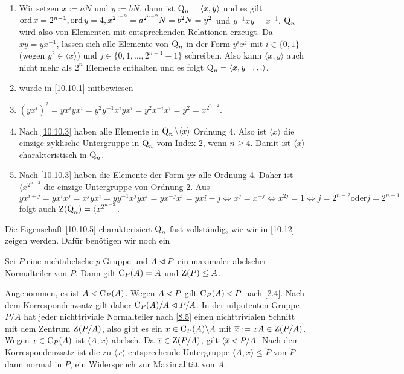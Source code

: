 \begin{beweis}\spspace
 \begin{enumerate}
  \item \label{10.10.1}Wir setzen $x:=aN$ und $y:=bN$, dann ist $\operatorname{Q}_n=\langle x,y\rangle$ und es gilt $\operatorname{ord} x=2^{n-1}, \operatorname{ord} y = 4, x^{2^{n-2}}=a^{2^{n-2}}N=b^2N=y^2$ und $y^{-1}xy=x^{-1}$. $\operatorname{Q}_n$ wird also von Elementen mit entsprechenden Relationen erzeugt. Da $xy=yx^{-1}$, lassen sich alle Elemente von $\operatorname{Q}_n$ in der Form $y^ix^j$ mit $i\in \lbrace 0,1\rbrace$ (wegen $y^2\in \langle x\rangle$) und $j\in \lbrace 0,1,\ldots, 2^{n-1}-1\rbrace$ schreiben. Also kann $\langle x,y\rangle$ auch nicht mehr als $2^n$ Elemente enthalten und es folgt $\operatorname{Q}_n=\langle x,y\mid\ldots\rangle$.
 \item wurde in \ref{10.10.1} mitbewiesen
 \item $(yx^i)^2=yx^iyx^i=y^2y^{-1}x^iyx^i=y^2x^{-i}x^i=y^2=x^{2^{n-2}}$.
 \item Nach \ref{10.10.3} haben alle Elemente in $\operatorname{Q}_n\backslash\langle x\rangle$ Ordnung $4$. Also ist $\langle x\rangle$ die einzige zyklische Untergruppe in $\operatorname{Q}_n$ vom Index $2$, wenn $n\geq 4$. Damit ist $\langle x\rangle$ charakteristisch in $\operatorname{Q}_n$.
 \item Nach \ref{10.10.3} haben die Elemente der Form $yx$ alle Ordnung $4$. Daher ist $\langle x^{2^{n-2}}$ die einzige Untergruppe von Ordnung $2$. Aus $yx^{i+j}=yx^ix^j=x^jyx^i=yy^{-1}x^jyx^i=yx^{-j}x^i=yx{i-j} \Longleftrightarrow x^j=x^{-j} \Longleftrightarrow x^{2j}=1 \Longleftrightarrow j=2^{n-2} \text{oder} j=2^{n-1}$ folgt auch $\operatorname{Z}(\operatorname{Q}_n)=\langle x^{2^{n-2}}$.
 \end{enumerate}

\end{beweis}

Die Eigenschaft \ref{10.10.5} charakterisiert $\operatorname{Q}_n$ fast vollst\"andig, wie wir in \ref{10.12} zeigen werden. Daf\"ur ben\"otigen wir noch ein 

\begin{lemma}\label{10.11}
 Sei $P$ eine nichtabelsche $p$-Gruppe und $A\lhd P$ ein maximaler abelscher Normalteiler von $P$. Dann gilt $\operatorname{C}_P(A)=A$ und $\operatorname{Z}(P)\leq A$.
\end{lemma}

\begin{beweis}
Angenommen, es ist $A<\operatorname{C}_P(A)$. Wegen $A\lhd P$ gilt $\operatorname{C}_P(A)\lhd P$ nach \ref{2.4}. Nach dem Korrespondenzsatz gilt daher $\operatorname{C}_P(A)/A \lhd P/A$. In der nilpotenten Gruppe $P/A$ hat jeder nichttriviale Normalteiler nach \ref{8.5} einen nichttrivialen Schnitt mit dem Zentrum $\operatorname{Z}(P/A)$, also gibt es ein $x\in\operatorname{C}_P(A)\backslash A$ mit $\overline{x}:=xA\in \operatorname{Z}(P/A)$. Wegen $x\in \operatorname{C}_P(A)$ ist $\langle A,x\rangle$ abelsch. Da $\overline{x}\in\operatorname{Z}(P/A)$, gilt $\langle \overline{x}\lhd P/A$. Nach dem Korrespondenzsatz ist die zu $\langle \overline{x}\rangle$ entsprechende Untergruppe $\langle A,x\rangle\leq P$ von $P$ dann normal in $P$, ein Widerspruch zur Maximalit\"at von $A$.
 
\end{beweis}

